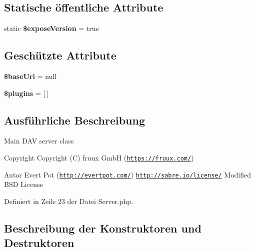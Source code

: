 \subsection*{Statische öffentliche Attribute}
\begin{DoxyCompactItemize}
\item 
\mbox{\label{class_sabre_1_1_d_a_v_1_1_server_a9c24f24b47e7d05a9be0f63243e817f2}} 
static {\bfseries \$expose\+Version} = true
\end{DoxyCompactItemize}
\subsection*{Geschützte Attribute}
\begin{DoxyCompactItemize}
\item 
\mbox{\label{class_sabre_1_1_d_a_v_1_1_server_ab9f77928d3e91b4892e0ea02fec70001}} 
{\bfseries \$base\+Uri} = null
\item 
\mbox{\label{class_sabre_1_1_d_a_v_1_1_server_acc839e60e477be014da9456ebdb6d6ba}} 
{\bfseries \$plugins} = \mbox{[}$\,$\mbox{]}
\end{DoxyCompactItemize}


\subsection{Ausführliche Beschreibung}
Main D\+AV server class

\begin{DoxyCopyright}{Copyright}
Copyright (C) fruux GmbH (\href{https://fruux.com/}{\tt https\+://fruux.\+com/}) 
\end{DoxyCopyright}
\begin{DoxyAuthor}{Autor}
Evert Pot (\href{http://evertpot.com/}{\tt http\+://evertpot.\+com/})  \href{http://sabre.io/license/}{\tt http\+://sabre.\+io/license/} Modified B\+SD License 
\end{DoxyAuthor}


Definiert in Zeile 23 der Datei Server.\+php.



\subsection{Beschreibung der Konstruktoren und Destruktoren}
\mbox{\label{class_sabre_1_1_d_a_v_1_1_server_aaff51826e67e363422c83ae0e379a2a0}} 
